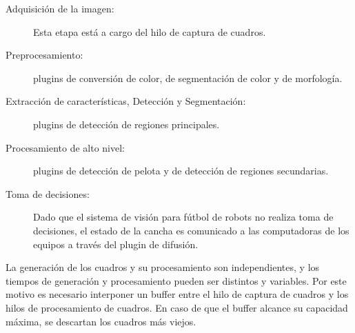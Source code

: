 \begin{description}

	\item[Adquisición de la imagen:] Esta etapa está a cargo del hilo de
		captura de cuadros.

	\item[Preprocesamiento:] plugins de conversión de color, de segmentación
		de color y de morfología.

	\item[Extracción de características, Detección y Segmentación:] plugins
		de detección de regiones principales.

	\item[Procesamiento de alto nivel:] plugins de detección de pelota y de
		detección de regiones secundarias.

	\item[Toma de decisiones:] Dado que el sistema de visión para fútbol de
		robots no realiza toma de decisiones, el estado de la cancha es
		comunicado a las computadoras de los equipos a través del plugin
		de difusión.

\end{description}

La generación de los cuadros y su procesamiento son independientes, y los
tiempos de generación y procesamiento pueden ser distintos y variables. Por este
motivo es necesario interponer un buffer entre el hilo de captura de cuadros y
los hilos de procesamiento de cuadros. En caso de que el buffer alcance su
capacidad máxima, se descartan los cuadros más viejos.
